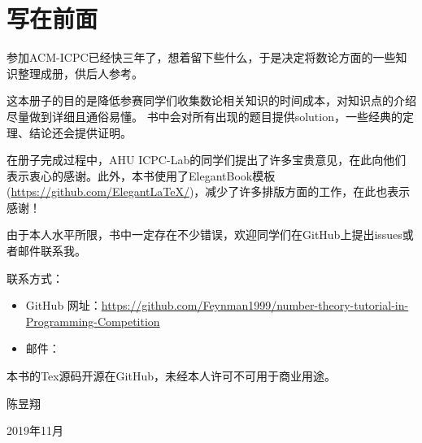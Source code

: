 \chapter*{写在前面}
	参加ACM-ICPC已经快三年了，想着留下些什么，于是决定将数论方面的一些知识整理成册，供后人参考。
	
	这本册子的目的是{\heiti 降低参赛同学们收集数论相关知识的时间成本}，对知识点的介绍尽量做到详细且通俗易懂。
	书中会对所有出现的题目提供solution，一些经典的定理、结论还会提供证明。
	
	在册子完成过程中，AHU ICPC-Lab的同学们提出了许多宝贵意见，在此向他们表示衷心的感谢。此外，本书使用了ElegantBook模板
	(\href{https://github.com/ElegantLaTeX/}{https://github.com/ElegantLaTeX/})，减少了许多排版方面的工作，在此也表示感谢！
		
	由于本人水平所限，书中一定存在不少错误，欢迎同学们在GitHub上提出issues或者邮件联系我。\\
	
	\vbox{}
	

联系方式：
	\begin{itemize}
		\item GitHub 网址：\href{https://github.com/Feynman1999/number-theory-tutorial-in-Programming-Competition}{https://github.com/Feynman1999/number-theory-tutorial-in-Programming-Competition}
		\item 邮件：
	\end{itemize}

\vbox{}

本书的Tex源码开源在GitHub，未经本人许可不可用于商业用途。\\

\vbox{}

\begin{flushright}
陈昱翔

2019年11月
\end{flushright}
	